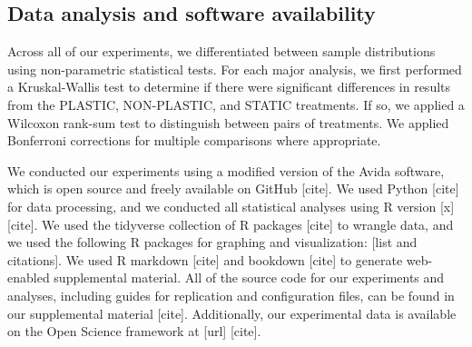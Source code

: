 \vspace{0.5cm}
\subsection{Data analysis and software availability}

Across all of our experiments, we differentiated between sample distributions using non-parametric statistical tests.
For each major analysis, we first performed a Kruskal-Wallis test \citep{kruskal_use_1952} to 
determine if there were significant differences in results from the PLASTIC, NON-PLASTIC, and STATIC treatments.
If so, we applied a Wilcoxon rank-sum test \citep{kotz_individual_1992} to distinguish between pairs of treatments.
We applied Bonferroni corrections for multiple comparisons \citep{rice_analyzing_1989} where appropriate.

We conducted our experiments using a modified version of the Avida software, which is open source and freely available on GitHub [cite].
We used Python [cite] for data processing, and we conducted all statistical analyses using R version [x] [cite].
We used the tidyverse collection of R packages [cite] to wrangle data, and we used the following R packages for graphing and visualization: [list and citations].
We used R markdown [cite] and bookdown [cite] to generate web-enabled supplemental material.
All of the source code for our experiments and analyses, including guides for replication and configuration files, can be found in our supplemental material [cite].
Additionally, our experimental data is available on the Open Science framework at [url] [cite].